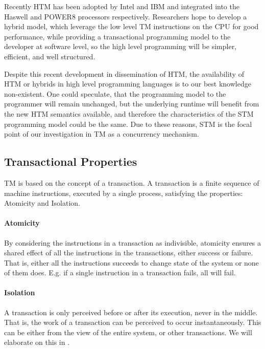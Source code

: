 Recently \ac{HTM} has been adopted by Intel and IBM and integrated into the Haswell and POWER8 processors respectively\cite{Anthes:2014:RSP:2684442.2667109}. Researchers hope to develop a hybrid model, which leverage the low level \ac{TM} instructions on the \ac{CPU} for good performance, while providing a transactional programming model to the developer at software level, so the high level programming will be simpler, efficient, and well structured\cite{Anthes:2014:RSP:2684442.2667109}.

Despite this recent development in dissemination of \ac{HTM}, the availability of \ac{HTM} or hybrids in high level programming languages is to our best knowledge non-existent. One could speculate, that the programming model to the programmer will remain unchanged, but the underlying runtime will benefit from the new \ac{HTM} semantics available, and therefore the characteristics of the \ac{STM} programming model could be the same. Due to these reasons, \ac{STM} is the focal point of our investigation in \ac{TM} as a concurrency mechanism. 

\subsection{Transactional Properties}
\label{sec:stm_tm_properties}
\ac{TM} is based on the concept of a transaction. A transaction is a finite sequence of machine instructions, executed by a single process, satisfying the properties: Atomicity and Isolation\cite[p. 2]{herlihy2011tm}.

\paragraph{Atomicity} By considering the instructions in a transaction as indivisible, atomicity ensures a shared effect of all the instructions in the transactions, either success or failure. That is, either all the instructions succeeds to change state of the system or none of them does. E.g. if a single instruction in a transaction fails, all will fail.
\paragraph{Isolation} A transaction is only perceived before or after its execution, never in the middle. That is, the work of a transaction can be perceived to occur instantaneously. This can be either from the view of the entire system, or other transactions. We will elaborate on this in .

